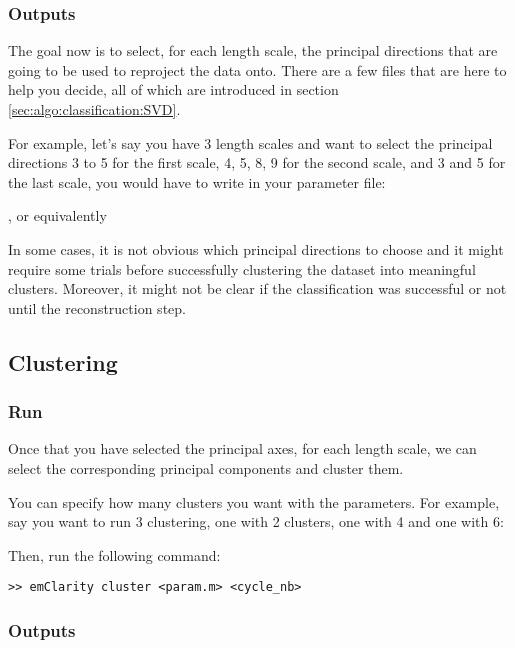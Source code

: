 \subsubsection{Outputs}

The goal now is to select, for each length scale, the principal directions that are going to be used to reproject the data onto. There are a few files that are here to help you decide, all of which are introduced in section \ref{sec:algo:classification:SVD}.

For example, let's say you have 3 length scales and want to select the principal directions 3 to 5 for the first scale, 4, 5, 8, 9 for the second scale, and 3 and 5 for the last scale, you would have to write in your parameter file:

, or equivalently\\

In some cases, it is not obvious which principal directions to choose and it might require some trials before successfully clustering the dataset into meaningful clusters. Moreover, it might not be clear if the classification was successful or not until the reconstruction step.

\subsection{Clustering}

\subsubsection{Run}

Once that you have selected the principal axes, for each length scale, we can select the corresponding principal components and cluster them.

You can specify how many clusters you want with the  parameters. For example, say you want to run 3 clustering, one with 2 clusters, one with 4 and one with 6:


Then, run the following command:
\begin{lstlisting}
>> emClarity cluster <param.m> <cycle_nb>
\end{lstlisting}

\subsubsection{Outputs} \label{sec:classification:clustering:outputs}

